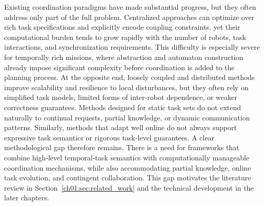 Existing coordination paradigms have made substantial progress, but they often
address only part of the full problem. Centralized approaches can optimize over
rich task specifications and explicitly encode coupling constraints, yet their
computational burden tends to grow rapidly with the number of robots, task
interactions, and synchronization requirements. This difficulty is especially
severe for temporally rich missions, where abstraction and automaton
construction already impose significant complexity before coordination is added
to the planning process.
At the opposite end, loosely coupled and distributed methods improve
scalability and resilience to local disturbances, but they often rely on
simplified task models, limited forms of inter-robot dependence, or weaker
correctness guarantees. Methods designed for static task sets do not extend
naturally to continual requests, partial knowledge, or dynamic communication
patterns. Similarly, methods that adapt well online do not always support
expressive task semantics or rigorous task-level guarantees.
A clear methodological gap therefore remains. There is a need for frameworks
that combine high-level temporal-task semantics with computationally manageable
coordination mechanisms, while also accommodating partial knowledge, online
task evolution, and contingent collaboration. This gap motivates the literature
review in Section~\ref{ch01:sec:related_work} and the technical development in the later chapters.
